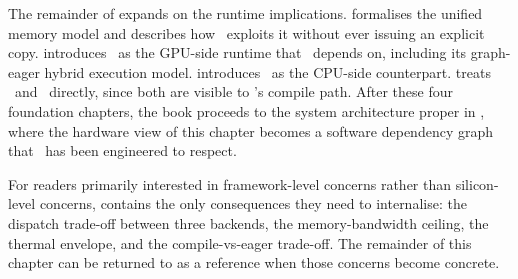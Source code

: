 The remainder of  expands on the runtime
implications.  formalises the unified memory
model and describes how \Lucid\ exploits it without ever issuing an
explicit copy.  introduces \MLX\ as the
GPU-side runtime that \Lucid\ depends on, including its
graph-eager hybrid execution model.  introduces
\Accelerate\ as the CPU-side counterpart. 
treats \Metal\ and \MPSGraph\ directly, since both are visible to
\Lucid's compile path. After these four foundation chapters, the
book proceeds to the system architecture proper in
, where the hardware view of this chapter becomes
a software dependency graph that \Lucid\ has been engineered to
respect.

\begin{lucidtip}
For readers primarily interested in framework-level concerns rather
than silicon-level concerns, 
contains the only consequences they need to internalise: the dispatch
trade-off between three backends, the memory-bandwidth ceiling, the
thermal envelope, and the compile-vs-eager trade-off. The remainder of
this chapter can be returned to as a reference when those concerns
become concrete.
\end{lucidtip}
